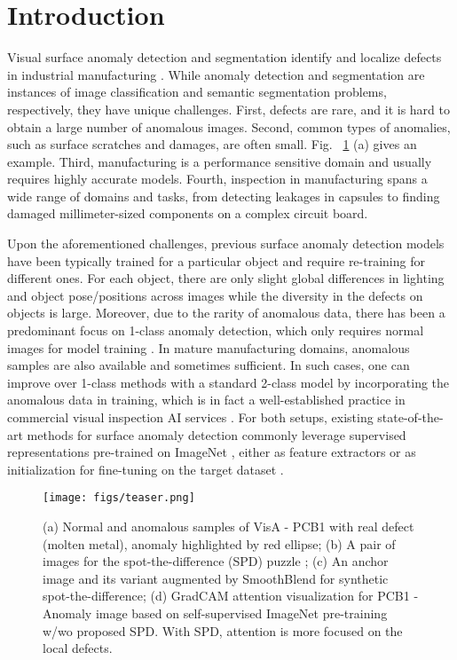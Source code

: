 \section{Introduction}
Visual surface anomaly detection and segmentation identify and localize defects in industrial manufacturing \cite{bergmann2021mvtec}. While anomaly detection and segmentation are instances of image classification and semantic segmentation problems, respectively, they have unique challenges. First, defects are rare, and it is hard to obtain a large number of anomalous images. Second, common types of anomalies, such as surface scratches and damages, are often small. Fig. ~\ref{fig:teaser} (a) gives an example. Third, manufacturing is a performance sensitive domain and usually requires highly accurate models. Fourth, inspection in manufacturing spans a wide range of domains and tasks, from detecting leakages in capsules to finding damaged millimeter-sized components on a complex circuit board. %

Upon the aforementioned challenges, previous surface anomaly detection models have been typically trained for a particular object and require re-training for different ones. For each object, there are only slight global differences in lighting and object pose/positions across images while the diversity in the defects on objects is large. 
Moreover, due to the rarity of anomalous data, there has been a predominant focus on 1-class anomaly detection, which only requires normal images for model training \cite{caron2020unsupervised,cohen2020sub,defard2021padim,li2021cutpaste,Roth_2022_CVPR,yi2020patch}. In mature manufacturing domains, anomalous samples are also available and sometimes sufficient. In such cases, one can improve over 1-class methods with a standard 2-class 
model \cite{cui2019class,feng2021few,gornitz2013toward,lin2017focal} by incorporating the anomalous data in training, which is in fact a well-established practice in %
commercial visual inspection AI services \cite{LfV,VIAI}.
For both setups, existing state-of-the-art methods for surface anomaly detection commonly leverage supervised representations pre-trained on ImageNet \cite{deng2009imagenet}, 
either as feature extractors \cite{defard2021padim,Roth_2022_CVPR} or as initialization for fine-tuning on the target dataset \cite{li2021cutpaste,yi2020patch}.

\begin{figure}[!t]
  \centering
  \texttt{[image: figs/teaser.png]}
  \caption{(a) Normal and anomalous samples of VisA - PCB1 with real defect (molten metal), anomaly highlighted by red ellipse; (b) A pair of images for the spot-the-difference (SPD) puzzle \cite{jhamtani2018learning}; (c) An anchor image and its variant augmented by SmoothBlend for synthetic spot-the-difference; (d) GradCAM attention visualization for PCB1 - Anomaly image based on self-supervised ImageNet pre-training w/wo proposed SPD. With SPD, attention is more focused on the local defects.}
  \label{fig:teaser}
\end{figure}

